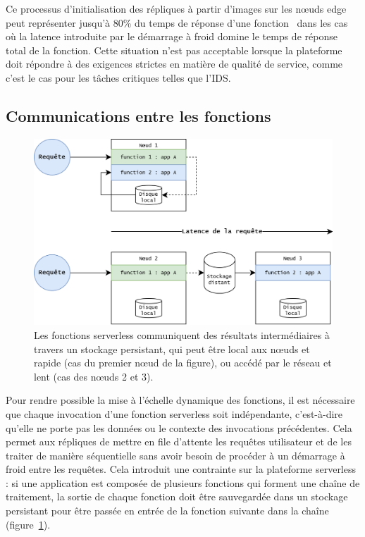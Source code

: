 Ce processus d'initialisation des répliques à partir d'images sur les nœuds edge peut représenter jusqu'à 80\% du temps de réponse d'une fonction~\cite{yanHermesEfficientCache2020} dans les cas où la latence introduite par le démarrage à froid domine le temps de réponse total de la fonction. Cette situation n'est pas acceptable lorsque la plateforme doit répondre à des exigences strictes en matière de qualité de service, comme c'est le cas pour les tâches critiques telles que l'IDS.

\subsection{Communications entre les fonctions}
\label{section:herocache-background-communications}

\begin{figure}[!ht]
    \centering
    \includegraphics[width=0.8\columnwidth]{5_Chapitre5/figures/function-communications.png}
    \caption{Les fonctions serverless communiquent des résultats intermédiaires à travers un stockage persistant, qui peut être local aux nœuds et rapide (cas du premier nœud de la figure), ou accédé par le réseau et lent (cas des nœuds 2 et 3).}
    \label{figure:herocache-function-communications}
\end{figure}

Pour rendre possible la mise à l'échelle dynamique des fonctions, il est nécessaire que chaque invocation d'une fonction serverless soit indépendante, c'est-à-dire qu'elle ne porte pas les données ou le contexte des invocations précédentes. Cela permet aux répliques de mettre en file d'attente les requêtes utilisateur et de les traiter de manière séquentielle sans avoir besoin de procéder à un démarrage à froid entre les requêtes. Cela introduit une contrainte sur la plateforme serverless : si une application est composée de plusieurs fonctions qui forment une chaîne de traitement, la sortie de chaque fonction doit être sauvegardée dans un stockage persistant pour être passée en entrée de la fonction suivante dans la chaîne~\cite{mullerLambadaInteractiveData2020} (figure~\ref{figure:herocache-function-communications}).

